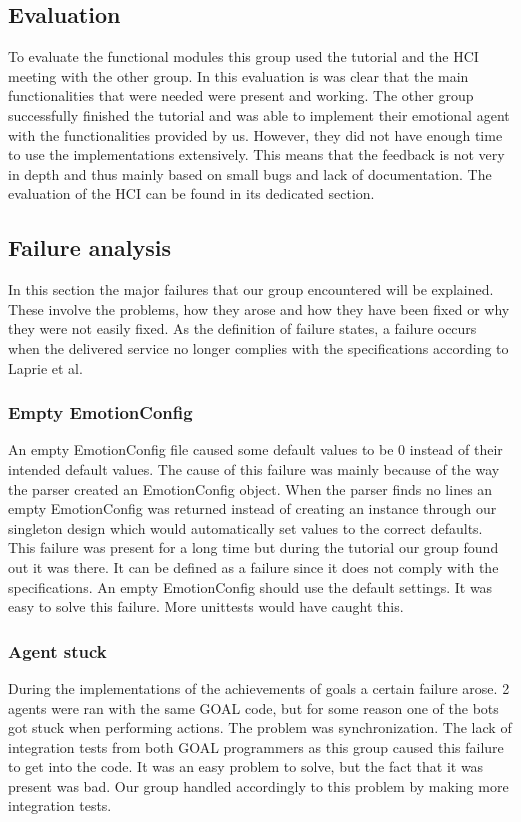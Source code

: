 \documentclass[11pt]{article}
\begin{document}
\subsection{Evaluation}
To evaluate the functional modules this group used the tutorial and the HCI meeting with the other group. In this evaluation is was clear that the main functionalities that were needed were present and working. The other group successfully finished the tutorial and was able to implement their emotional agent with the functionalities provided by us. However, they did not have enough time to use the implementations extensively. This means that the feedback is not very in depth and thus mainly based on small bugs and lack of documentation. The evaluation of the HCI can be found in its dedicated section.

\subsection{Failure analysis}
In this section the major failures that our group encountered will be explained. These involve the problems, how they arose and how they have been fixed or why they were not easily fixed. As the definition of failure states, a failure occurs when the delivered service no longer complies with the specifications according to Laprie et al.\cite{failure}

\subsubsection*{Empty EmotionConfig}
An empty EmotionConfig file caused some default values to be 0 instead of their intended default values. The cause of this failure was mainly because of the way the parser created an EmotionConfig object. When the parser finds no lines an empty EmotionConfig was returned instead of creating an instance through our singleton design which would automatically set values to the correct defaults. This failure was present for a long time but during the tutorial our group found out it was there. It can be defined as a failure since it does not comply with the specifications. An empty EmotionConfig should use the default settings. It was easy to solve this failure. More unittests would have caught this.

\subsubsection*{Agent stuck}
During the implementations of the achievements of goals a certain failure arose. 2 agents were ran with the same GOAL code, but for some reason one of the bots got stuck when performing actions. The problem was synchronization. The lack of integration tests from both GOAL programmers as this group caused this failure to get into the code. It was an easy problem to solve, but the fact that it was present was bad. Our group handled accordingly to this problem by making more integration tests. 
\end{document}
